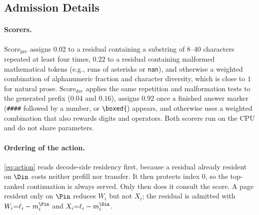 \subsection{Admission Details}
\label{sec:app-detail}

\paragraph{Scorers.}
$\mathrm{Score}_{\mathrm{pre}}$ assigns $0.02$ to a residual containing a substring of $8$--$40$ characters repeated at least four times, $0.22$ to a residual containing malformed mathematical tokens (e.g., runs of asterisks or \texttt{nan}), and otherwise a weighted combination of alphanumeric fraction and character diversity, which is close to $1$ for natural prose.
$\mathrm{Score}_{\mathrm{dec}}$ applies the same repetition and malformation tests to the generated prefix ($0.04$ and $0.16$), assigns $0.92$ once a finished answer marker (\texttt{\#\#\#\#} followed by a number, or \texttt{\textbackslash boxed\{}) appears, and otherwise uses a weighted combination that also rewards digits and operators.
Both scorers run on the CPU and do not share parameters.

\paragraph{Ordering of the action.}
\eqref{eq:action} reads decode-side residency first, because a residual already resident on $\Din$ costs neither prefill nor transfer.
It then protects index $0$, so the top-ranked continuation is always served.
Only then does it consult the score.
A page resident only on $\Pin$ reduces $W_i$ but not $X_i$; the residual is admitted with $W_i{=}\ell_i-m_i^{\Pin}$ and $X_i{=}\ell_i-m_i^{\Din}$.


